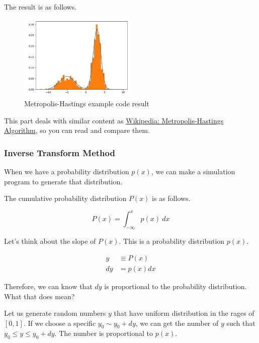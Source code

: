 \begin{example}
The result is as follows.

\begin{figure}[h]
\centering
\includegraphics[width=0.5\textwidth]{figs/met.png}
\caption{Metropolis-Hastings example code result}
\end{figure}

\end{example}

This part deals with similar content as \href{https://en.wikipedia.org/wiki/Metropolis%E2%80%93Hastings_algorithm}{Wikipedia: Metropolis-Hastings Algorithm}, so you can read and compare them.

\subsubsection{Inverse Transform Method}

When we have a probability distribution $p(x)$, we can make a simulation program to generate that distribution.

The cumulative probability distribution $P(x)$ is as follows.

\begin{equation}
    P(x) = \int_{-\infty}^x p(x) \ dx
\end{equation}

Let's think about the slope of $P(x)$. This is a probability distribution $p(x)$.

\begin{align}
    y &\equiv P(x) \\
    dy &= p(x)dx
\end{align}

Therefore, we can know that $dy$ is proportional to the probability distribution. What that does mean?

Let us generate random numbers $y$ that have uniform distribution in the rages of $[0,1]$. If we choose a specific $y_0 \sim y_0 + dy$, we can get the number of $y$ such that $y_0 \leq y \leq y_0 + dy$. The number is proportional to $p(x)$.

